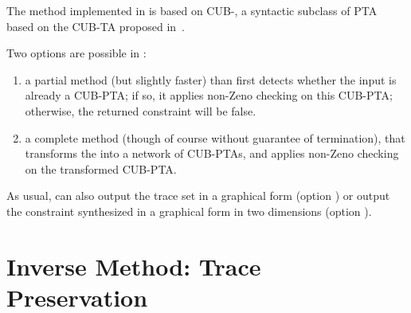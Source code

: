 The method implemented in \imitator{} is based on CUB-\IPTA{}, a syntactic subclass of PTA based on the CUB-TA proposed in~\cite{WSWLSDYL15}.

Two options are possible in \imitator{}:
\begin{enumerate}
	\item a partial method (but slightly faster) than first detects whether the input \NIPTA{} is already a CUB-PTA; if so, it applies non-Zeno checking on this CUB-PTA; otherwise, the returned constraint will be false.
	

	
	\item a complete method (though of course without guarantee of termination), that transforms the \NIPTA{} into a network of CUB-PTAs, and applies non-Zeno checking on the transformed CUB-PTA.
	

\end{enumerate}



As usual, \imitator{} can also
	output the trace set in a graphical form (option )
	or
	output the constraint synthesized in a graphical form in two dimensions (option ).



\section{Inverse Method: Trace Preservation}\label{ss:mode:IM}

